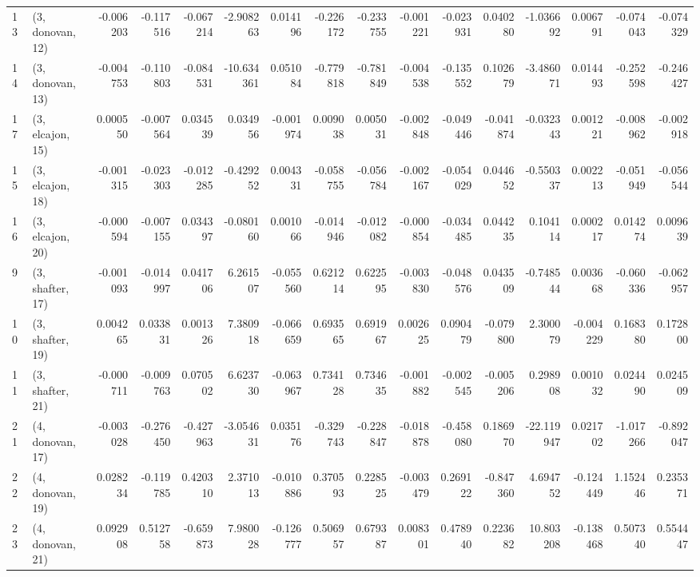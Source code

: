 \begin{tabular}{llrrrrrrrrrrrrrr}
13 &  (3, donovan, 12) &  -0.006203 & -0.117516 & -0.067214 &  -2.908263 &  0.014196 &  -0.226172 & -0.233755 & -0.001221 & -0.023931 &  0.040280 &  -1.036692 &  0.006791 & -0.074043 & -0.074329 \\
14 &  (3, donovan, 13) &  -0.004753 & -0.110803 & -0.084531 & -10.634361 &  0.051084 &  -0.779818 & -0.781849 & -0.004538 & -0.135552 &  0.102679 &  -3.486071 &  0.014493 & -0.252598 & -0.246427 \\
17 &  (3, elcajon, 15) &   0.000550 & -0.007564 &  0.034539 &   0.034956 & -0.001974 &   0.009038 &  0.005031 & -0.002848 & -0.049446 & -0.041874 &  -0.032343 &  0.001221 & -0.008962 & -0.002918 \\
15 &  (3, elcajon, 18) &  -0.001315 & -0.023303 & -0.012285 &  -0.429252 &  0.004331 &  -0.058755 & -0.056784 & -0.002167 & -0.054029 &  0.044652 &  -0.550337 &  0.002213 & -0.051949 & -0.056544 \\
16 &  (3, elcajon, 20) &  -0.000594 & -0.007155 &  0.034397 &  -0.080160 &  0.001066 &  -0.014946 & -0.012082 & -0.000854 & -0.034485 &  0.044235 &   0.104114 &  0.000217 &  0.014274 &  0.009639 \\
9  &  (3, shafter, 17) &  -0.001093 & -0.014997 &  0.041706 &   6.261507 & -0.055560 &   0.621214 &  0.622595 & -0.003830 & -0.048576 &  0.043509 &  -0.748544 &  0.003668 & -0.060336 & -0.062957 \\
10 &  (3, shafter, 19) &   0.004265 &  0.033831 &  0.001326 &   7.380918 & -0.066659 &   0.693565 &  0.691967 &  0.002625 &  0.090479 & -0.079800 &   2.300079 & -0.004229 &  0.168380 &  0.172800 \\
11 &  (3, shafter, 21) &  -0.000711 & -0.009763 &  0.070502 &   6.623730 & -0.063967 &   0.734128 &  0.734635 & -0.001882 & -0.002545 & -0.005206 &   0.298908 &  0.001032 &  0.024490 &  0.024509 \\
21 &  (4, donovan, 17) &  -0.003028 & -0.276450 & -0.427963 &  -3.054631 &  0.035176 &  -0.329743 & -0.228847 & -0.018878 & -0.458080 &  0.186970 & -22.119947 &  0.021702 & -1.017266 & -0.892047 \\
22 &  (4, donovan, 19) &   0.028234 & -0.119785 &  0.420310 &   2.371013 & -0.010886 &   0.370593 &  0.228525 & -0.003479 &  0.269122 & -0.847360 &   4.694752 & -0.124449 &  1.152446 &  0.235371 \\
23 &  (4, donovan, 21) &   0.092908 &  0.512758 & -0.659873 &   7.980028 & -0.126777 &   0.506957 &  0.679387 &  0.008301 &  0.478940 &  0.223682 &  10.803208 & -0.138468 &  0.507340 &  0.554447 \\

\end{tabular}
